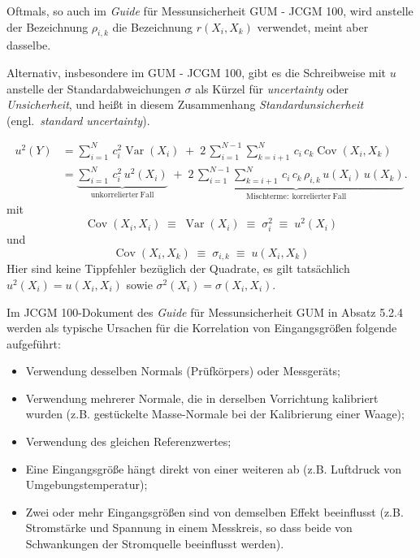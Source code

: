 Oftmals, so auch im \textsl{Guide} für Messunsicherheit GUM - JCGM 100, wird anstelle der 
Bezeichnung $\rho_{i,k}$ die
Bezeichnung $r(X_{i},X_{k})$ verwendet, meint aber dasselbe.

Alternativ, insbesondere im GUM - JCGM 100, gibt es die Schreibweise mit $u$ anstelle der 
Standardabweichungen $\sigma$ als Kürzel für \textsl{uncertainty} oder \textsl{Unsicherheit},
und heißt in diesem Zusammenhang \textsl{Standardunsicherheit} (engl.\ \textsl{standard uncertainty}).

\begin{equation}
{\begin{aligned}
u^2(Y) & = \sum\limits_{i=1}^{N} \, c_i^2 \operatorname {Var}(X_{i}) \; + \; 2 \, \sum _{{i=1}}^{{N-1}}
  \sum\limits_{k=i+1}^{N} \, c_i \, c_k \operatorname {Cov}(X_{i},X_{k})\\
 & = \underbrace{\sum\limits_{i=1}^{N} \, c_i^2 \, u^2(X_i)}_{\mathrm{unkorrelierter~Fall}} \;  + \; 
 \underbrace{2 \, \sum\limits_{i=1}^{{N-1}}
 \sum\limits_{k=i+1}^{N} \, c_i \, c_k \, \rho_{i,k} \, u(X_i) \, u(X_k)}_{\mathrm{Mischterme:~korrelierter~Fall}} .
\end{aligned}}
\label{UnsichFortpfl2}
\end{equation}
mit
\begin{equation}
\operatorname{Cov}(X_i, X_i) \; \equiv \; \operatorname{Var}(X_i) 
\; \equiv \; \sigma^2_i \; \equiv \;  u^2(X_i)
\end{equation}
und
\begin{equation}
\operatorname{Cov}(X_i, X_k) \; \equiv \; 
\sigma_{i,k} \; \equiv \; u(X_i,X_k)
\end{equation}
Hier sind keine Tippfehler bezüglich der Quadrate, es gilt tatsächlich $u^2(X_i) = u(X_i,X_i)$
sowie $\sigma^2(X_i) = \sigma(X_i,X_i)$.

Im JCGM 100-Dokument des \textsl{Guide} für Messunsicherheit GUM in Absatz 5.2.4
werden als typische Ursachen für die Korrelation von Eingangsgrößen  folgende aufgeführt:
\begin{itemize}
\item Verwendung desselben Normals (Prüfkörpers) oder Messgeräts;
\item Verwendung mehrerer Normale, die in derselben Vorrichtung kalibriert
wurden (z.B. gestückelte Masse-Normale bei der Kalibrierung einer Waage);
\item Verwendung des gleichen Referenzwertes;
\item Eine Eingangsgröße hängt direkt von einer weiteren ab
(z.B. Luftdruck von Um\-geb\-ungs\-tem\-pe\-ra\-tur);
\item Zwei oder mehr Eingangsgrößen sind von
demselben Effekt beeinflusst
(z.B. Stromstärke und Spannung in einem Messkreis, so dass beide
von Schwankungen der Stromquelle beeinflusst werden).
\end{itemize}

